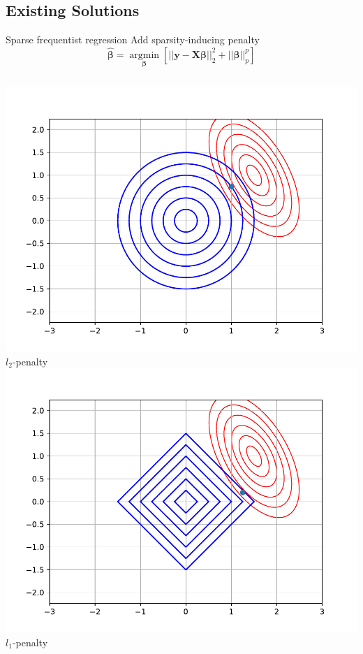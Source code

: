 \documentclass[9pt]{beamer}
\begin{document}
\subsection[Existing Solutions]{Existing Solutions}
\begin{frame}{Sparse frequentist regression}
  Add \alert{sparsity-inducing penalty}
  \begin{equation*}
    \widehat{\boldsymbol\beta} = \underset{\boldsymbol\beta}{\operatorname{argmin}}\left[||\mathbf{y} - \mathbf{X}\boldsymbol\beta||_2^2 + ||\boldsymbol\beta||_p^p\right]
  \end{equation*}
  \centering
  \begin{columns}
    \begin{column}{0.25\textwidth}
      \centering
      \includegraphics[width=\textwidth]{sparse/l2_ball} \\
      \(l_2\)-penalty \\
      \includegraphics[width=\textwidth]{sparse/l1_ball} \\
      \(l_1\)-penalty
    \end{column}


\end{columns}
\end{frame}
\end{document}
